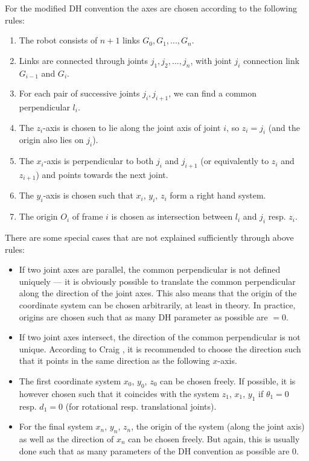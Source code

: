 \documentclass[pdftex,11pt,a4paper]{report}
\begin{document}
For the modified DH convention the  axes are chosen according to the following rules:
\begin{enumerate}
\item The robot consists of $n + 1$ links $G_0, G_1,  . . . , G_n$.
\item Links are connected through joints $j_1, j_2, . . . , j_n$, with joint $j_i$ connection link $G_{i-1}$ and $G_i$.
\item For each pair of successive joints $j_i, j_{i+1}$, we can find a common perpendicular $l_i$.
\item The $z_i$-axis is chosen to lie along the joint axis of joint $i$, so $z_i = j_i$ (and the origin also lies on $j_i$).
\item The $x_i$-axis is perpendicular to both $j_i$ and $j_{i+1}$ (or equivalently to $z_i$ and $z_{i+1}$) and points towards the next joint.
\item The $y_i$-axis is chosen such that $x_i$, $y_i$, $z_i$ form a right hand system.
\item The origin $O_i$ of frame $i$ is chosen as intersection between $l_i$ and $j_i$ resp. $z_i$.
\end{enumerate}

There are some special cases that are not explained sufficiently through above rules:
\begin{itemize}
\item If two joint axes are parallel, the common perpendicular is not defined uniquely --- it is obviously possible to translate the common perpendicular along the direction
of the joint axes. This also means that the origin of the coordinate system can be
chosen arbitrarily, at least in theory. In practice, origins are chosen such that as
many DH parameter as possible are $= 0$.
\item If two joint axes intersect, the direction of the common perpendicular is not unique. According to Craig \cite{Cra89robotics}, it is recommended to choose the direction such that it points in the same direction as the following $x$-axis.
\item The first coordinate system $x_0$, $y_0$, $z_0$ can be chosen freely. If possible, it is however chosen such that it coincides with the system $z_1$, $x_1$, $y_1$ if $\theta_1 = 0$ resp. $d_1 = 0$ (for rotational resp. translational joints).
\item For the final system $x_n$, $y_n$, $z_n$, the origin of the system (along the joint axis) as well as the direction of $x_n$ can be chosen freely. But again, this is usually done such that as many parameters of the DH convention as possible are 0.
\end{itemize}
\end{document}
